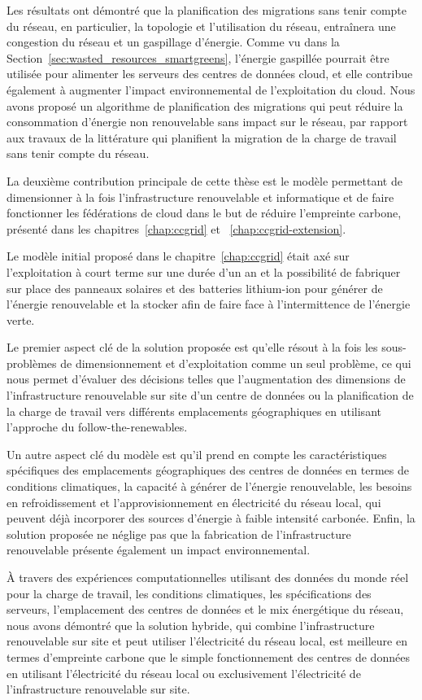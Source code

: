Les résultats ont démontré que la planification des migrations sans tenir compte du réseau, en particulier, la topologie et l'utilisation du réseau, entraînera une congestion du réseau et un gaspillage d'énergie. Comme vu dans la Section~\ref{sec:wasted_resources_smartgreens}, l'énergie gaspillée pourrait être utilisée pour alimenter les serveurs des centres de données cloud, et elle contribue également à augmenter l'impact environnemental de l'exploitation du cloud. Nous avons proposé un algorithme de planification des migrations qui peut réduire la consommation d'énergie non renouvelable sans impact sur le réseau, par rapport aux travaux de la littérature qui planifient la migration de la charge de travail sans tenir compte du réseau.


La deuxième contribution principale de cette thèse est le modèle permettant de dimensionner à la fois l'infrastructure renouvelable et informatique et de faire fonctionner les fédérations de cloud dans le but de réduire l'empreinte carbone, présenté dans les chapitres~\ref{chap:ccgrid} et ~\ref{chap:ccgrid-extension}.


Le modèle initial proposé dans le chapitre~\ref{chap:ccgrid} était axé sur l'exploitation à court terme sur une durée d'un an et la possibilité de fabriquer sur place des panneaux solaires et des batteries lithium-ion pour générer de l'énergie renouvelable et la stocker afin de faire face à l'intermittence de l'énergie verte.


Le premier aspect clé de la solution proposée est qu'elle résout à la fois les sous-problèmes de dimensionnement et d'exploitation comme un seul problème, ce qui nous permet d'évaluer des décisions telles que l'augmentation des dimensions de l'infrastructure renouvelable sur site d'un centre de données ou la planification de la charge de travail vers différents emplacements géographiques en utilisant l'approche du follow-the-renewables.


Un autre aspect clé du modèle est qu'il prend en compte les caractéristiques spécifiques des emplacements géographiques des centres de données en termes de conditions climatiques, la capacité à générer de l'énergie renouvelable, les besoins en refroidissement et l'approvisionnement en électricité du réseau local, qui peuvent déjà incorporer des sources d'énergie à faible intensité carbonée. Enfin, la solution proposée ne néglige pas que la fabrication de l'infrastructure renouvelable présente également un impact environnemental.


À travers des expériences computationnelles utilisant des données du monde réel pour la charge de travail, les conditions climatiques, les spécifications des serveurs, l'emplacement des centres de données et le mix énergétique du réseau, nous avons démontré que la solution hybride, qui combine l'infrastructure renouvelable sur site et peut utiliser l'électricité du réseau local, est meilleure en termes d'empreinte carbone que le simple fonctionnement des centres de données en utilisant l'électricité du réseau local ou exclusivement l'électricité de l'infrastructure renouvelable sur site.

